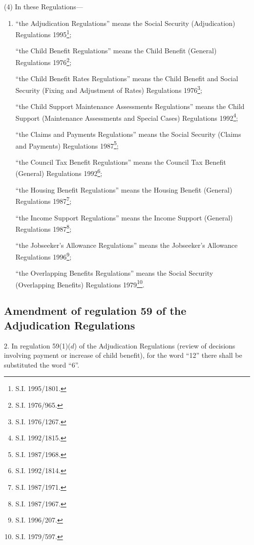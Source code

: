 \documentclass[12pt,a4paper]{article}
\begin{document}
(4) In these Regulations—
\begin{enumerate}\item[]
“the Adjudication Regulations” means the Social Security (Adjudication) Regulations 1995\footnote{\frenchspacing S.I. 1995/1801.};

“the Child Benefit Regulations” means the Child Benefit (General) Regulations 1976\footnote{\frenchspacing S.I. 1976/965.};

“the Child Benefit Rates Regulations” means the Child Benefit and Social Security (Fixing and Adjustment of Rates) Regulations 1976\footnote{\frenchspacing S.I. 1976/1267.};

“the Child Support Maintenance Assessments Regulations” means the Child Support (Maintenance Assessments and Special Cases) Regulations 1992\footnote{\frenchspacing S.I. 1992/1815.};

“the Claims and Payments Regulations” means the Social Security (Claims and Payments) Regulations 1987\footnote{\frenchspacing S.I. 1987/1968.};

“the Council Tax Benefit Regulations” means the Council Tax Benefit (General) Regulations 1992\footnote{\frenchspacing S.I. 1992/1814.};

“the Housing Benefit Regulations” means the Housing Benefit (General) Regulations 1987\footnote{\frenchspacing S.I. 1987/1971.};

“the Income Support Regulations” means the Income Support (General) Regulations 1987\footnote{\frenchspacing S.I. 1987/1967.};

\begin{sloppypar}
“the Jobseeker’s Allowance Regulations” means the Jobseeker’s Allowance Regulations 1996\footnote{\frenchspacing S.I. 1996/207.};
\end{sloppypar}

“the Overlapping Benefits Regulations” means the Social Security (Overlapping Benefits) Regulations 1979\footnote{\frenchspacing S.I. 1979/597.}.
\end{enumerate}

\subsection[2. Amendment of regulation 59 of the Adjudication Regulations]{Amendment of regulation 59 of the Adjudication Regulations}

2.  In regulation 59(1)($d$) of the Adjudication Regulations (review of decisions involving payment or increase of child benefit), for the word “12” there shall be substituted the word “6”.
\end{document}
